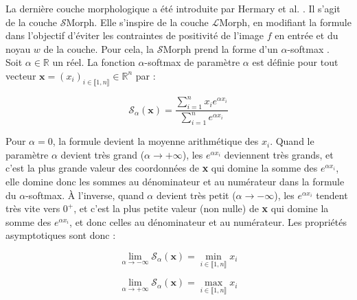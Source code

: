 La dernière couche morphologique a été introduite par Hermary et al. \cite{Hermary_2022}. Il s’agit de la couche $\mathcal{S}$Morph. Elle s'inspire de la couche $\mathcal{L}$Morph, en modifiant la formule dans l'objectif d'éviter les contraintes de positivité de l'image $f$ en entrée et du noyau $w$ de la couche. Pour cela, la $\mathcal{S}$Morph prend la forme d'un $\alpha$-softmax \cite{Lange_2014}. \\

\vspace{-1.6mm}
\noindent Soit $\alpha \in \mathbb{R}$ un réel. La fonction $\alpha$-softmax de paramètre $\alpha$ est définie pour tout vecteur $\textbf{x} = (x_i)_{i \in \llbracket 1,n \rrbracket} \in \mathbb{R}^n$ par :

\vspace{-3.6mm}
\begin{equation}
    \mathcal{S}_\alpha(\textbf{x}) = \frac{\sum_{i=1}^n x_i e^{\alpha x_i}}{\sum_{i=1}^n e^{\alpha x_i}}
    \label{alpha_softmax}
\end{equation}

\vspace{3.4mm}
\noindent Pour $\alpha = 0$, la formule devient la moyenne arithmétique des $x_i$.
Quand le paramètre $\alpha$ devient très grand ($\alpha \rightarrow +\infty$), les $e^{\alpha x_i}$ deviennent très grands, et c'est la plus grande valeur des coordonnées de \textbf{x} qui domine la somme des $e^{\alpha x_i}$, elle domine donc les sommes au dénominateur et au numérateur dans la formule du $\alpha$-softmax. À l'inverse, quand $\alpha$ devient très petit ($\alpha \rightarrow -\infty$), les $e^{\alpha x_i}$ tendent très vite vers $0^+$, et c'est la plus petite valeur (non nulle) de \textbf{x} qui domine la somme des $e^{\alpha x_i}$, et donc celles au dénominateur et au numérateur. Les propriétés asymptotiques sont donc :

\vspace{3mm}
\noindent\begin{minipage}{.5\linewidth}
    \begin{equation*} 
        \lim_{\alpha \rightarrow -\infty} \mathcal{S}_\alpha(\textbf{x}) = \min_{i \in \llbracket 1,n \rrbracket} x_i
    \end{equation*}
\end{minipage}%
\begin{minipage}{.5\linewidth}
    \begin{equation*} 
        \lim_{\alpha \rightarrow +\infty} \mathcal{S}_\alpha(\textbf{x}) = \max_{i \in \llbracket 1,n \rrbracket} x_i
    \end{equation*}
\end{minipage}

